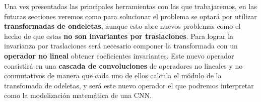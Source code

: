 \medskip


\noindent Una vez presentadas las principales herramientas con las que trabajaremos, en las futuras secciones veremos como para solucionar el problema se optará por utilizar \textbf{transformadas de ondeletas}, aunque esto abre nuevos problemas como el hecho de que estas \textbf{no son invariantes por traslaciones}. Para lograr la invarianza por traslaciones será necesario componer la transformada con un \textbf{operador no lineal} obtener coeficientes invariantes. Este nuevo operador consistirá en una \textbf{cascada de convoluciones} de operadores no lineales y no conmutativos de manera que cada uno de ellos calcula el módulo de la transfomada de odeletas, y será este nuevo operador el que podremos interpretar como la modelización matemática de una CNN.


\endinput

